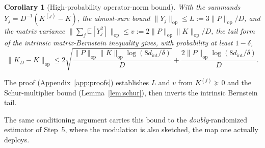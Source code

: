 \documentclass{article}
\newtheorem{corollary}[theorem]{Corollary}
\begin{document}
\begin{corollary}[High-probability operator-norm bound]\label{cor:bernstein_tail}
With the summands $Y_j=D^{-1}(K^{(j)}-K)$, the almost-sure bound $\|Y_j\|_{\mathrm{op}}\le L:=3\|P\|_{\mathrm{op}}/D$, and the matrix variance $\bigl\|\sum_j\mathbb{E}[Y_j^2]\bigr\|_{\mathrm{op}}\le v:=2\|P\|_{\mathrm{op}}\|K\|_{\mathrm{op}}/D$, the tail form of the intrinsic matrix-Bernstein inequality \citep[Thm.~7.3.1]{tropp2015matrix} gives, with probability at least $1-\delta$,
\begin{equation}\label{eq:bernstein_tail}
\|K_D-K\|_{\mathrm{op}}\le 2\sqrt{\frac{\|P\|_{\mathrm{op}}\|K\|_{\mathrm{op}}\log(8d_{\mathrm{int}}/\delta)}{D}}+\frac{2\|P\|_{\mathrm{op}}\log(8d_{\mathrm{int}}/\delta)}{D}.
\end{equation}
\end{corollary}
\noindent The proof (Appendix~\ref{app:proofs}) establishes $L$ and $v$ from $K^{(j)}\succeq0$ and the Schur-multiplier bound (Lemma~\ref{lem:schur}), then inverts the intrinsic Bernstein tail.

The same conditioning argument carries this bound to the \emph{doubly}-randomized estimator of Step~5, where the modulation is also sketched, the map one actually deploys.
\end{document}
